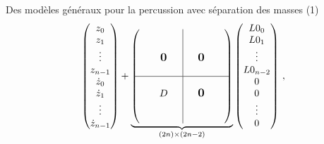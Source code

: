 \begin{frame}{Des modèles généraux pour la percussion avec séparation des masses (1)}
\begin{align}
      \begin{pmatrix}
        z_0 \\ z_1 \\ \vdots \\ z_{n-1} \\ \dot z_0 \\ \dot z_1 \\ \vdots \\ \dot z_{n-1}
        \end{pmatrix}
    +
    \underbrace{\begin{pmatrix}
        \begin{matrix}
       & & &  \\ & & &  \\ & & \bigzero & \\ & & & \\      
        \end{matrix}
        & \rvline 
        &     \begin{matrix}
            & & &  \\ & & &  \\ & \bigzero & & \\ & & & \\      
             \end{matrix}  \\ 
        \hline
        \begin{matrix}
            & & &  \\ & & D & \\ & & & \\ & & & \\     
        \end{matrix}
        & \rvline 
        &   \begin{matrix}
            & & &  \\ & \bigzero & &  \\ & &  & \\ & & & \\      
            \end{matrix}
      \end{pmatrix}}_{(2n) \times (2n-2)}
      \begin{pmatrix}
        L0_0 \\ L0_1 \\ \vdots \\ L0_{n-2} \\ 0 \\ 0 \\ \vdots \\ 0
        \end{pmatrix} \,,
	\end{align}
	

\end{frame}

